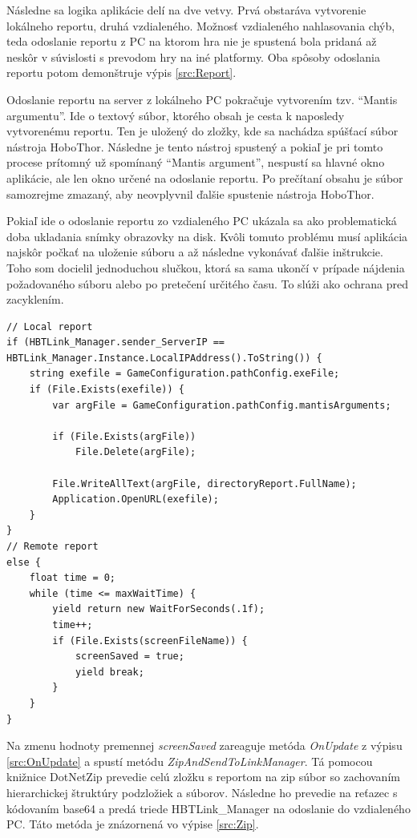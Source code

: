 \documentclass[slovak, bachelorpractice]{diploma}
\begin{document}
Následne sa logika aplikácie delí na dve vetvy. Prvá obstaráva vytvorenie lokálneho reportu, druhá vzdialeného. Možnosť vzdialeného nahlasovania chýb, teda odoslanie reportu z PC na ktorom hra nie je spustená bola pridaná až neskôr v súvislosti s prevodom hry na iné platformy. Oba spôsoby odoslania reportu potom demonštruje výpis \ref{src:Report}.

Odoslanie reportu na server z lokálneho PC pokračuje vytvorením tzv. \enquote{Mantis argumentu}. Ide o textový súbor, ktorého obsah je cesta k naposledy vytvorenému reportu. Ten je uložený do zložky, kde sa nachádza spúšťací súbor nástroja HoboThor. Následne je tento nástroj spustený a pokiaľ je pri tomto procese prítomný už spomínaný \enquote{Mantis argument}, nespustí sa hlavné okno aplikácie, ale len okno určené na odoslanie reportu. Po prečítaní obsahu je súbor samozrejme zmazaný, aby neovplyvnil ďalšie spustenie nástroja HoboThor.

Pokiaľ ide o odoslanie reportu zo vzdialeného PC ukázala sa ako problematická doba ukladania snímky obrazovky na disk. Kvôli tomuto problému musí aplikácia najskôr počkať na uloženie súboru a až následne vykonávať ďalšie inštrukcie. Toho som docielil jednoduchou slučkou, ktorá sa sama ukončí v prípade nájdenia požadovaného súboru alebo po pretečení určitého času. To slúži ako ochrana pred zacyklením. 

\vspace{10pt}
\begin{lstlisting}[label=src:Report,caption={Vytváranie lokálneho a vzdialeného reportu}]
// Local report
if (HBTLink_Manager.sender_ServerIP == HBTLink_Manager.Instance.LocalIPAddress().ToString()) {
    string exefile = GameConfiguration.pathConfig.exeFile;
    if (File.Exists(exefile)) {
        var argFile = GameConfiguration.pathConfig.mantisArguments;

        if (File.Exists(argFile))
            File.Delete(argFile);

        File.WriteAllText(argFile, directoryReport.FullName);
        Application.OpenURL(exefile);
    }
}
// Remote report
else {
    float time = 0;
    while (time <= maxWaitTime) {
        yield return new WaitForSeconds(.1f);
        time++;
        if (File.Exists(screenFileName)) {
            screenSaved = true;
            yield break;
        }
    }
}
\end{lstlisting}

Na zmenu hodnoty premennej \textit{screenSaved} zareaguje metóda \textit{OnUpdate} z výpisu \ref{src:OnUpdate} a spustí metódu \textit{ZipAndSendToLinkManager}. Tá pomocou knižnice DotNetZip \cite{DotNetZip} prevedie celú zložku s reportom na zip súbor so zachovaním hierarchickej štruktúry podzložiek a súborov. Následne ho prevedie na reťazec s kódovaním base64 a predá triede HBTLink\_Manager na odoslanie do vzdialeného PC. Táto metóda je znázornená vo výpise \ref{src:Zip}. 
\end{document}
